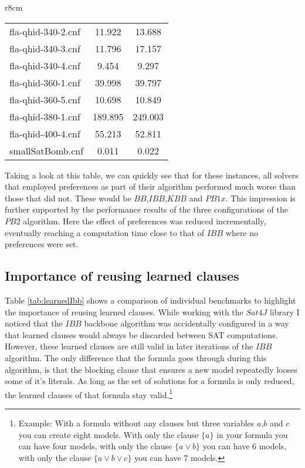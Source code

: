 \begin{wraptable}[29]{r}{8cm}
\begin{tabular}{l| c c }
fla-qhid-340-2.cnf & 11.922 & 13.688 \\
fla-qhid-340-3.cnf & 11.796 & 17.157 \\
fla-qhid-340-4.cnf & 9.454 & 9.297 \\
fla-qhid-360-1.cnf & 39.998 & 39.797 \\
fla-qhid-360-5.cnf & 10.698 & 10.849 \\
fla-qhid-380-1.cnf & 189.895 & 249.003 \\
fla-qhid-400-4.cnf & 55.213 & 52.811 \\
smallSatBomb.cnf & 0.011 & 0.022 \\
\end{tabular}
\caption{Backbone computation time of the $IBB$ algorithm, once with keeping learned clauses ($t_{keep}$) and once discarding learned clauses between every sat call($t_{discard}$)}
\label{tab:learnedIbb} %
\end{wraptable} 
Taking a look at this table, we can quickly see that for these instances, all solvers that employed preferences as part of their algorithm performed much worse than those that did not. These would be $BB$,$IBB$,$KBB$ and $PB1x$. This impression is further supported by the performance results of the three configurations of the $PB2$ algorithm. Here the effect of preferences was reduced incrementally, eventually reaching a computation time close to that of $IBB$ where no preferences were set.



\subsection{Importance of reusing learned clauses}
Table \ref{tab:learnedIbb} shows a comparison of individual benchmarks to highlight the importance of reusing learned clauses. While working with the $Sat4J$ library I noticed that the $IBB$ backbone algorithm was accidentally configured in a way that learned clauses would always be discarded between SAT computations. However, these learned clauses are still valid in later iterations of the $IBB$ algorithm. The only difference that the formula goes through during this algorithm, is that the blocking clause that ensures a new model repeatedly looses some of it's literals. As long as the set of solutions for a formula is only reduced, the learned clauses of that formula stay valid.\footnote{Example: With a formula without any clauses but three variables $a$,$b$ and $c$ you can create eight models. With only the clause $\{a\}$ in your formula you can have four models, with only the clause $\{a \lor b\}$ you can have 6 models, with only the clause $\{a\lor b \lor c\}$ you can have 7 models.}

